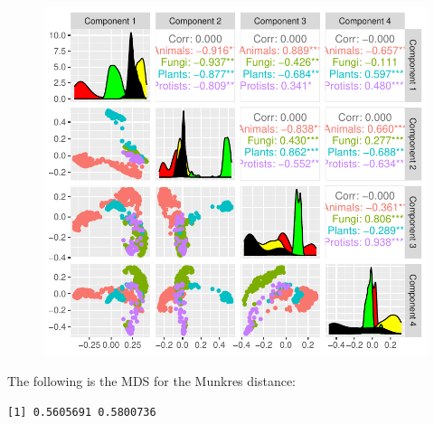 \documentclass[
  letterpaper,
  DIV=11,
  numbers=noendperiod]{scrreprt}
\newenvironment{Shaded}{}{}
\newcommand{\AttributeTok}[1]{\textcolor[rgb]{0.78,0.47,0.87}{#1}}
\newcommand{\ConstantTok}[1]{\textcolor[rgb]{0.82,0.60,0.40}{#1}}
\newcommand{\DecValTok}[1]{\textcolor[rgb]{0.82,0.60,0.40}{#1}}
\newcommand{\DocumentationTok}[1]{\textcolor[rgb]{0.64,0.20,0.25}{#1}}
\newcommand{\FunctionTok}[1]{\textcolor[rgb]{0.38,0.69,0.94}{#1}}
\newcommand{\NormalTok}[1]{\textcolor[rgb]{0.67,0.70,0.75}{#1}}
\newcommand{\OtherTok}[1]{\textcolor[rgb]{0.15,0.68,0.38}{#1}}
\newcommand{\SpecialCharTok}[1]{\textcolor[rgb]{0.34,0.71,0.76}{#1}}
\begin{document}
\begin{figure}[H]

{\centering \includegraphics[width=1\textwidth,height=\textheight]{m_DAGs_similarity_files/figure-pdf/unnamed-chunk-11-1.pdf}

}

\end{figure}

The following is the MDS for the Munkres distance:

\begin{Shaded}
\end{Shaded}

\begin{verbatim}
[1] 0.5605691 0.5800736
\end{verbatim}
\end{document}
